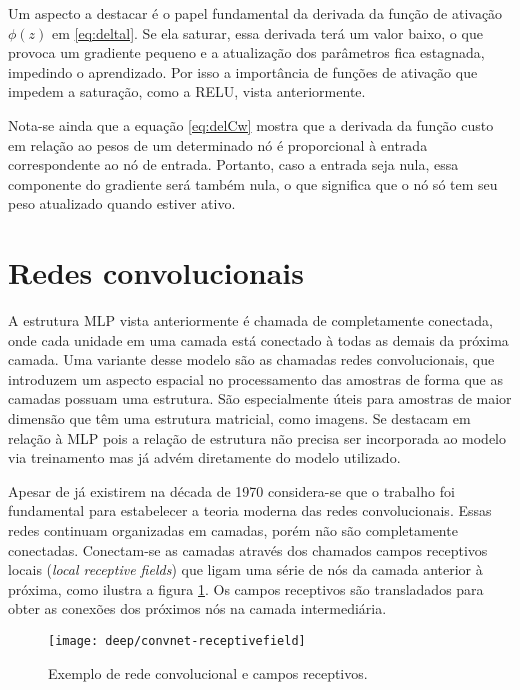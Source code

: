 Um aspecto a destacar é o papel fundamental da derivada da função de ativação $\phi(z)$ em \eqref{eq:deltal}. Se ela saturar, essa derivada terá um valor baixo, o que provoca um gradiente pequeno e a atualização dos parâmetros fica estagnada, impedindo o aprendizado. Por isso a importância de funções de ativação que impedem a saturação, como a RELU, vista anteriormente.

Nota-se ainda que a equação \eqref{eq:delCw} mostra que a derivada da função custo em relação ao pesos de um determinado nó é proporcional à entrada correspondente ao nó de entrada. Portanto, caso a entrada seja nula, essa componente do gradiente será também nula, o que significa que o nó só tem seu peso atualizado quando estiver ativo.

\section{Redes convolucionais}
\label{sec:convnets}

A estrutura MLP vista anteriormente é chamada de completamente conectada, onde cada unidade em uma camada está conectado à todas as demais da próxima camada. Uma variante desse modelo são as chamadas redes convolucionais, que introduzem um aspecto espacial no processamento das amostras de forma que as camadas possuam uma estrutura. São especialmente úteis para amostras de maior dimensão que têm uma estrutura matricial, como imagens. Se destacam em relação à MLP pois a relação de estrutura não precisa ser incorporada ao modelo via treinamento mas já advém diretamente do modelo utilizado.

Apesar de já existirem na década de 1970 considera-se que o trabalho \cite{lecun1998convnet} foi fundamental para estabelecer a teoria moderna das redes convolucionais. Essas redes continuam organizadas em camadas, porém não são completamente conectadas. Conectam-se as camadas através dos chamados campos receptivos locais (\textit{local receptive fields}) que ligam uma série de nós da camada anterior à próxima, como ilustra a figura \ref{fig:convnet-receptivefield}. Os campos receptivos são transladados para obter as conexões dos próximos nós na camada intermediária.

\begin{figure}
\centering
\texttt{[image: deep/convnet-receptivefield]}
\caption{Exemplo de rede convolucional e campos receptivos.}
\label{fig:convnet-receptivefield}
\end{figure}

